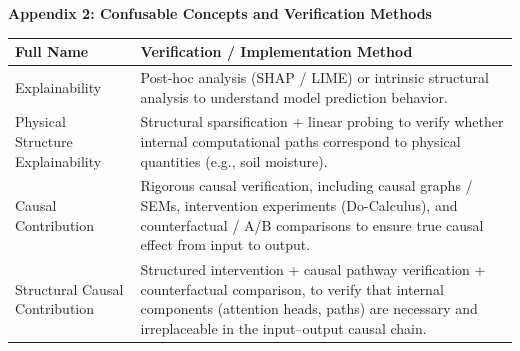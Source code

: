 \begin{table}[htbp]
\centering
\noindent\textbf{Appendix 2: Confusable Concepts and Verification Methods}
\vspace{0.5em}
\begin{tabularx}{\textwidth}{p{4cm} X}
\toprule
\textbf{Full Name} & \textbf{Verification / Implementation Method} \\
\midrule
Explainability & Post-hoc analysis (SHAP / LIME) or intrinsic structural analysis to understand model prediction behavior. \\
Physical Structure Explainability & Structural sparsification + linear probing to verify whether internal computational paths correspond to physical quantities (e.g., soil moisture). \\
Causal Contribution & Rigorous causal verification, including causal graphs / SEMs, intervention experiments (Do-Calculus), and counterfactual / A/B comparisons to ensure true causal effect from input to output. \\
Structural Causal Contribution & Structured intervention + causal pathway verification + counterfactual comparison, to verify that internal components (attention heads, paths) are necessary and irreplaceable in the input–output causal chain. \\
\bottomrule
\end{tabularx}
\end{table}
\FloatBarrier